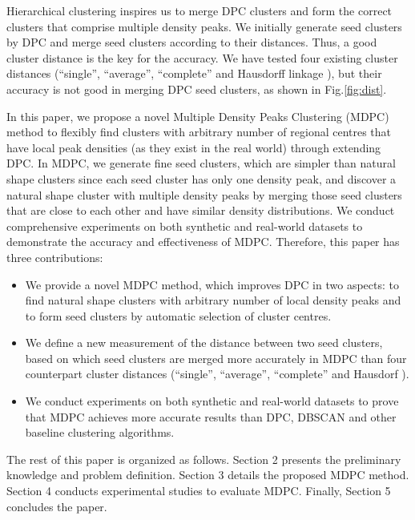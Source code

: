 \documentclass{llncs}
\begin{document}
Hierarchical clustering inspires us to merge DPC clusters and form the correct clusters that comprise multiple density peaks. We initially generate seed clusters by DPC and merge seed clusters according to their distances. Thus, a good cluster distance is the key for the accuracy. We have tested four existing cluster distances (``single'', ``average'', ``complete'' and Hausdorff linkage \cite{hausdorff}), but their accuracy is not good in merging DPC seed clusters, as shown in Fig.\ref{fig:dist}.

In this paper, we propose a novel Multiple Density Peaks Clustering (MDPC) method to flexibly find clusters with arbitrary number of regional centres that have local peak densities (as they exist in the real world) through extending DPC. In MDPC, we generate fine seed clusters, which are simpler than natural shape clusters since each seed cluster has only one density peak, and discover a natural shape cluster with multiple density peaks by merging those seed clusters that are close to each other and have similar density distributions. We conduct comprehensive experiments on both synthetic and real-world datasets to demonstrate the accuracy and effectiveness of MDPC. Therefore, this paper has three contributions:
\begin{itemize}
\item We provide a novel MDPC method, which improves DPC in two aspects: to find natural shape clusters with arbitrary number of  local density peaks and to form seed clusters by automatic selection of cluster centres.
\item We define a new measurement of the distance between two seed clusters, based on which seed clusters are merged more accurately in MDPC than four counterpart cluster distances (``single'', ``average'', ``complete'' and Hausdorf \cite{hausdorff}).
\item We conduct experiments on both synthetic and real-world datasets to prove that MDPC achieves more accurate results than DPC, DBSCAN and other baseline clustering algorithms.
\end{itemize}
The rest of this paper is organized as follows. Section 2 presents the preliminary knowledge and problem definition. Section 3 details the proposed MDPC method. Section 4 conducts experimental studies to evaluate MDPC. Finally, Section 5 concludes the paper.
\end{document}
